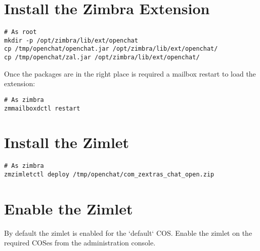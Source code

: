 \section{Install the Zimbra Extension}
\begin{verbatim}
# As root
mkdir -p /opt/zimbra/lib/ext/openchat
cp /tmp/openchat/openchat.jar /opt/zimbra/lib/ext/openchat/
cp /tmp/openchat/zal.jar /opt/zimbra/lib/ext/openchat/
\end{verbatim}
Once the packages are in the right place is required a mailbox restart to load the extension:
\begin{verbatim}
# As zimbra
zmmailboxdctl restart
\end{verbatim}

\section{Install the Zimlet}
\begin{verbatim}
# As zimbra
zmzimletctl deploy /tmp/openchat/com_zextras_chat_open.zip
\end{verbatim}

\section{Enable the Zimlet}
By default the zimlet is enabled for the `default` COS.
Enable the zimlet on the required COSes from the administration console.